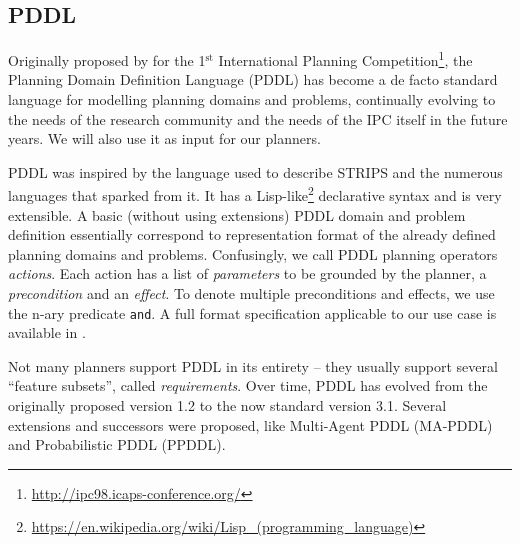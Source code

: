 \subsection{PDDL}\label{pddl}

Originally proposed by \citet{McDermott1998} for the 1$^{\mathrm{st}}$ International Planning
Competition\footnote{\url{http://ipc98.icaps-conference.org/}},
the Planning Domain Definition Language (PDDL) has become
a de facto standard language for modelling planning domains and problems,
continually evolving to the needs of the  
research community and the needs of the IPC itself in the future years.
We will also use it as input for our planners.

PDDL was inspired by the language used to describe STRIPS \citep{Fikes1971}
and the numerous languages that sparked from it.
It has a Lisp-like\footnote{\url{https://en.wikipedia.org/wiki/Lisp_(programming_language)}}
declarative syntax and is very extensible.
A basic (without using extensions) PDDL domain and problem definition essentially correspond to representation format of the already defined planning domains and problems. Confusingly, we call PDDL planning operators \textit{actions}.
Each action has a list of \textit{parameters} to be grounded by the planner,
a \textit{precondition} and an \textit{effect}. To denote multiple
preconditions and effects, we use the n-ary predicate \texttt{and}.
A full format specification applicable to our use case is available in \citet[Appendix A]{Fox2003}.

Not many planners support PDDL in its entirety -- they usually support 
several ``feature subsets'', called \textit{requirements}.
Over time, PDDL has evolved from the originally proposed version 1.2
to the now standard version 3.1. Several extensions and successors were proposed,
like Multi-Agent PDDL
(MA-PDDL) and
Probabilistic PDDL
(PPDDL).

